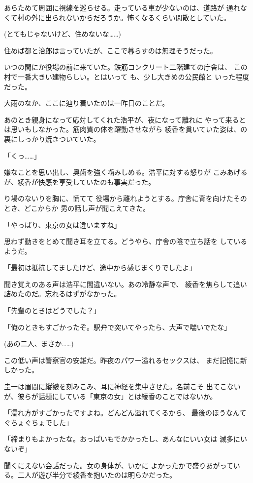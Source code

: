 ﻿\documentclass[
    book,tate,
    line_length=30zw,
    jafontsize=12pt,
    paper=b5j,
    landscape,
    ]{jlreq}
\begin{document}
あらためて周囲に視線を巡らせる。走っている車が少ないのは、道路が
通れなくて村の外に出られないからだろうか。怖くなるくらい閑散としていた。

(とてもじゃないけど、住めないな……)

住めば都と治郎は言っていたが、ここで暮らすのは無理そうだった。

いつの間にか役場の前に来ていた。鉄筋コンクリート二階建ての庁舎は、
この村で一番大きい建物らしい。とはいって も、少し大きめの公民館と
いった程度だった。

大雨のなか、ここに辿り着いたのは一昨日のことだ。

あのとき親身になって応対してくれた浩平が、夜になって離れに
やって来るとは思いもしなかった。筋肉質の体を躍動させながら
綾香を貫いていた姿は、の裏にしっかり焼きついていた。

「くっ……」

嫌なことを思い出し、奥歯を強く噛みしめる。浩平に対する怒りが
こみあげるが、綾香が快感を享受していたのも事実だった。

り場のないりを胸に、慌てて
役場から離れようとする。庁舎に背を向けたそのとき、どこからか
男の話し声が聞こえてきた。

「やっぱり、東京の女は違いますね」

思わず動きをとめて聞き耳を立てる。どうやら、庁舎の陰で立ち話を
しているようだ。

「最初は抵抗してましたけど、途中から感じまくりでしたよ」

聞き覚えのある声は浩平に間違いない。あの冷静な声で、
綾香を焦らして追い詰めたのだ。忘れるはずがなかった。

「先輩のときはどうでした？」

「俺のときもすごかったぞ。駅弁で突いてやったら、大声で喘いでたな」

(あの二人、まさか……)

この低い声は警察官の安雄だ。昨夜のパワー溢れるセックスは、
まだ記憶に新しかった。

圭一は眉間に縦皺を刻みこみ、耳に神経を集中させた。名前こそ
出てこないが、彼らが話題にしている「東京の女」とは綾香のことではないか。

「濡れ方がすごかったですよね。どんどん溢れてくるから、
最後のほうなんてぐちょぐちょでした」

「締まりもよかったな。おっぱいもでかかったし、あんなにいい女は
滅多にいないぞ」

聞くにえない会話だった。女の身体が、いかに
よかったかで盛りあがっている。二人が遊び半分で綾香を抱いたのは明らかだった。
\end{document}
